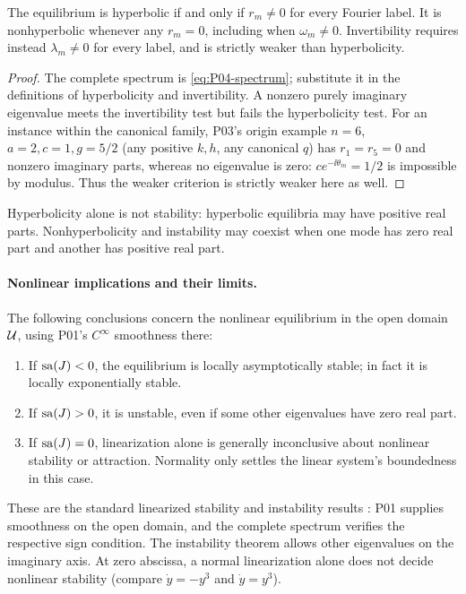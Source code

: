 \begin{proposition}[Hyperbolicity]
\label{prop:P04-hyperbolicity}
The equilibrium is hyperbolic if and only if $r_m\ne0$ for every
Fourier label. It is nonhyperbolic whenever any $r_m=0$, including
when $\omega_m\ne0$. Invertibility requires instead
$\lambda_m\ne0$ for every label, and is strictly weaker than
hyperbolicity.
\end{proposition}
\begin{proof}
The complete spectrum is \eqref{eq:P04-spectrum}; substitute it in
the definitions of hyperbolicity and invertibility. A nonzero purely
imaginary eigenvalue meets the invertibility test but fails the
hyperbolicity test. For an instance within the canonical family,
P03's origin example $n=6$, $a=2,c=1,g=5/2$ (any positive $k,h$,
any canonical $q$) has $r_1=r_5=0$ and nonzero imaginary parts,
whereas no eigenvalue is zero: $ce^{-\ii\theta_m}=1/2$ is impossible
by modulus. Thus the weaker criterion is strictly weaker here as well.
\end{proof}
Hyperbolicity alone is not stability: hyperbolic equilibria may have
positive real parts. Nonhyperbolicity and instability may coexist
when one mode has zero real part and another has positive real part.

\paragraph{Nonlinear implications and their limits.}
The following conclusions concern the nonlinear equilibrium in the
open domain $\mathcal{U}$, using P01's $C^\infty$ smoothness there:
\begin{enumerate}[label=(\roman*),leftmargin=*]
\item If $\operatorname{sa}(J)<0$, the equilibrium is locally asymptotically stable;
in fact it is locally exponentially stable.
\item If $\operatorname{sa}(J)>0$, it is unstable, even if some other eigenvalues
have zero real part.
\item If $\operatorname{sa}(J)=0$, linearization alone is generally inconclusive
about nonlinear stability or attraction. Normality only settles the
linear system's boundedness in this case.
\end{enumerate}

These are the standard linearized stability and instability results
\cite[Ch.~1]{GuckenheimerHolmes1983}: P01 supplies smoothness on the
open domain, and the complete spectrum verifies the respective sign
condition. The instability theorem allows other eigenvalues on the
imaginary axis. At zero abscissa, a normal linearization alone does not
decide nonlinear stability (compare $\dot y=-y^3$ and $\dot y=y^3$).

